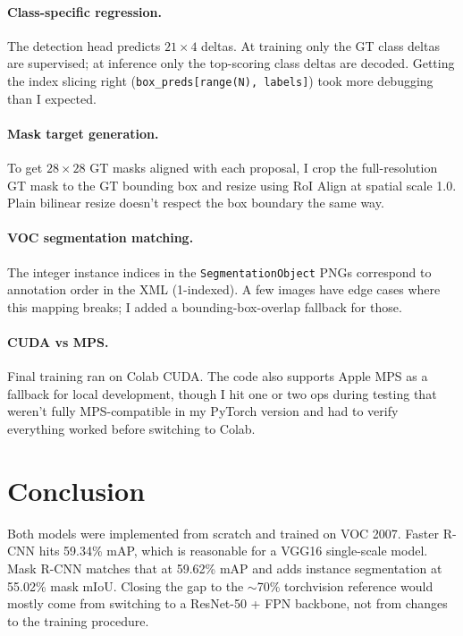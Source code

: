 \documentclass[11pt]{article}
\begin{document}
\paragraph{Class-specific regression.}
The detection head predicts $21\times4$ deltas. At training only the GT class deltas are supervised; at inference only the top-scoring class deltas are decoded. Getting the index slicing right (\texttt{box\_preds[range(N), labels]}) took more debugging than I expected.

\paragraph{Mask target generation.}
To get $28\times28$ GT masks aligned with each proposal, I crop the full-resolution GT mask to the GT bounding box and resize using RoI Align at spatial scale 1.0. Plain bilinear resize doesn't respect the box boundary the same way.

\paragraph{VOC segmentation matching.}
The integer instance indices in the \texttt{SegmentationObject} PNGs correspond to annotation order in the XML (1-indexed). A few images have edge cases where this mapping breaks; I added a bounding-box-overlap fallback for those.

\paragraph{CUDA vs MPS.}
Final training ran on Colab CUDA. The code also supports Apple MPS as a fallback for local development, though I hit one or two ops during testing that weren't fully MPS-compatible in my PyTorch version and had to verify everything worked before switching to Colab.

\section{Conclusion}

Both models were implemented from scratch and trained on VOC 2007. Faster R-CNN hits 59.34\% mAP, which is reasonable for a VGG16 single-scale model. Mask R-CNN matches that at 59.62\% mAP and adds instance segmentation at 55.02\% mask mIoU. Closing the gap to the $\sim$70\% torchvision reference would mostly come from switching to a ResNet-50 + FPN backbone, not from changes to the training procedure.
\end{document}
